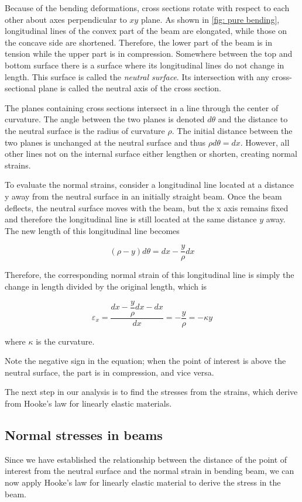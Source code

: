 \documentclass[a4paper,openany,12pt]{book}
\begin{document}
Because of the bending deformations, cross sections rotate with respect
to each other about axes perpendicular to \(xy\) plane. As shown in \ref{fig: pure bending}, longitudinal lines of the
convex part of the beam are elongated, while those on the concave side
are shortened. Therefore, the lower part of the beam is in tension while
the upper part is in compression. Somewhere between the top and bottom
surface there is a surface where its longitudinal lines do not change in
length. This surface is called the \emph{neutral surface}. Its intersection
with any cross-sectional plane is called the neutral axis of the cross
section.

The planes containing cross sections intersect in a line through the
center of curvature. The angle between the two planes is denoted
\(d\theta\) and the distance to the neutral surface is the radius of
curvature \(\rho\). The initial distance between the two planes is
unchanged at the neutral surface and thus \(\rho d \theta = dx\). However,
all other lines not on the internal surface either lengthen or shorten,
creating normal strains.

To evaluate the normal strains, consider a longitudinal line located at
a distance y away from the neutral surface in an initially straight
beam. Once the beam deflects, the neutral surface moves with the beam,
but the x axis remains fixed and therefore the longitudinal line is
still located at the same distance \(y\) away. The new length of this
longitudinal line becomes

$$(\rho  - y)d\theta  = dx - \dfrac{y}{\rho }dx$$

Therefore, the corresponding normal strain of this longitudinal line is
simply the change in length divided by the original length, which is

$$\varepsilon _x = \frac{dx - \dfrac{y}{\rho }dx - dx}{dx} =  - \dfrac{y}{\rho } =  - \kappa y$$

where \(\kappa\) is the curvature.

Note the negative sign in the equation; when the point of interest is
above the neutral surface, the part is in compression, and vice versa.

The next step in our analysis is to find the stresses from the strains,
which derive from Hooke's law for linearly elastic materials.

\subsection{Normal stresses in beams}
\label{normal-stresses-in-beams}
Since we have established the relationship between the distance of the
point of interest from the neutral surface and the normal strain in
bending beam, we can now apply Hooke's law for linearly elastic material
to derive the stress in the beam.
\end{document}
